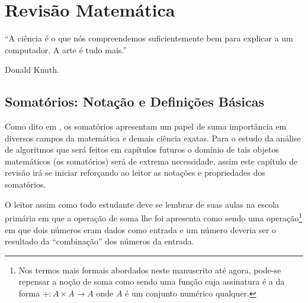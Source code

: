 \chapter{Revisão Matemática}\label{cap:IntroducaoComplexidade}


\epigraph{``A ciência é o que nós compreendemos suficientemente bem para explicar a um computador. A arte é tudo mais.''}{Donald Knuth.}

\section{Somatórios: Notação e Definições Básicas}

Como dito em \cite{carmo2013}, os somatórios apresentam um papel de suma importância em diversos campos da matemática e demais ciência exatas. Para o estudo da análise de algoritmos que será feitos em capítulos futuros o domínio de tais objetos matemáticos (os somatórios) será de extrema necessidade, assim este capítulo de revisão irá se iniciar reforçando ao leitor as notações e propriedades dos somatórios.

O leitor assim como todo estudante deve se lembrar de suas aulas na escola primária em que a operação de soma lhe foi apresenta como sendo uma operação\footnote{Nos termos mais formais abordados neste manuscrito até agora, pode-se repensar a noção de soma como sendo uma função cuja assinatura é a da forma $+: A \times A \rightarrow A$ onde $A$ é um conjunto numérico qualquer.} em que dois números eram dados como entrada e um número deveria ser o resultado da ``combinação'' dos números da entrada.